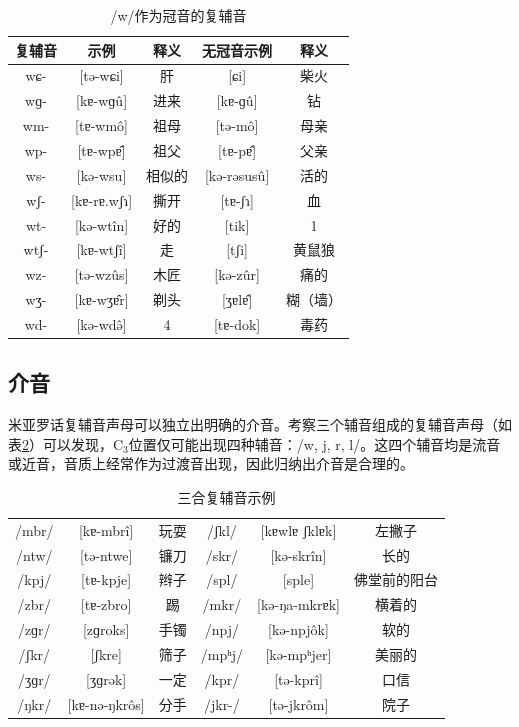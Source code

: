 \begin{table}[H]
\vspace{5pt}
    \centering
    \caption{/w/作为冠音的复辅音}
    \label{wpre}
\begin{tabular}{c|cccc}
     \toprule
复辅音   & 示例              & 释义   & 无冠音示例          & 释义        \\
     \midrule
	wɕ-  & {[}tə-wɕi{]}    & 肝   & {[}ɕi{]}         & 柴火   \\
wɡ-  & {[}kɐ-wɡû{]}   & 进来  & {[}kɐ-ɡû{]}     & 钻    \\
wm-  & {[}tɐ-wmô{]}   & 祖母  & {[}tə-mô{]}     & 母亲   \\
wp-  & {[}tɐ-wpɐ̂{]}   & 祖父  & {[}tɐ-pɐ̂{]}     & 父亲   \\
ws-  & {[}kə-wsu{]}    & 相似的 & {[}kə-rəsusû{]} & 活的   \\
wʃ-  & {[}kɐ-rɐ.wʃɿ{]} & 撕开  & {[}tɐ-ʃɿ{]}      & 血    \\
wt-  & {[}kə-wtîn{]}  & 好的  & {[}tik{]}        & 1    \\
wtʃ- & {[}kɐ-wtʃî{]}  & 走   & {[}tʃi{]}        & 黄鼠狼  \\
wz-  & {[}tə-wzûs{]}  & 木匠  & {[}kə-zûr{]}    & 痛的   \\
wʒ-  & {[}kɐ-wʒɐ̂r{]}  & 剃头  & {[}ʒɐlɐ̂{]}      & 糊（墙）\\
wd- & {[}kə-wdə̂{]}  & 4  & {[}tɐ-dok{]}   & 毒药      \\
   \bottomrule
\end{tabular}
\end{table}

\subsection{介音}

米亚罗话复辅音声母可以独立出明确的介音。考察三个辅音组成的复辅音声母（如表\ref{comconex}）可以发现，C$_{3}$位置仅可能出现四种辅音：/w, j, r, l/。这四个辅音均是流音或近音，音质上经常作为过渡音出现，因此归纳出介音是合理的。

\begin{table}[H]
\vspace{5pt}
    \centering
    \caption{三合复辅音示例}
    \label{comconex}
\begin{tabular}{ccc|ccc}
     \toprule
	/mbr/ & [kɐ-mbrî] & 玩耍 & /ʃkl/ & [kɐwlɐ ʃklɐk] & 左撇子 \\
	/ntw/ & [tə-ntwe] & 镰刀 & /skr/ & [kə-skrîn] & 长的 \\
	/kpj/ & [tɐ-kpje] & 辫子 & /spl/ & [sple] & 佛堂前的阳台 \\
	/zbr/ & [tɐ-zbro] & 踢 & /mkr/ & [kə-ŋa-mkrɐk] & 横着的 \\
	/zɡr/ & [zɡroks] & 手镯 & /npj/ & [kə-npjôk] & 软的 \\
	/ʃkr/ & [ʃkre] & 筛子 & /mpʰj/ & [kə-mpʰjer] & 美丽的 \\ 
	/ʒɡr/ & [ʒɡrək] & 一定 & /kpr/ & [tə-kprî] & 口信 \\ 
	/ŋkr/ & [kɐ-nə-ŋkrôs] & 分手 & /jkr-/ & [tə-jkrôm] & 院子 \\ 
   \bottomrule
\end{tabular}
\end{table}

